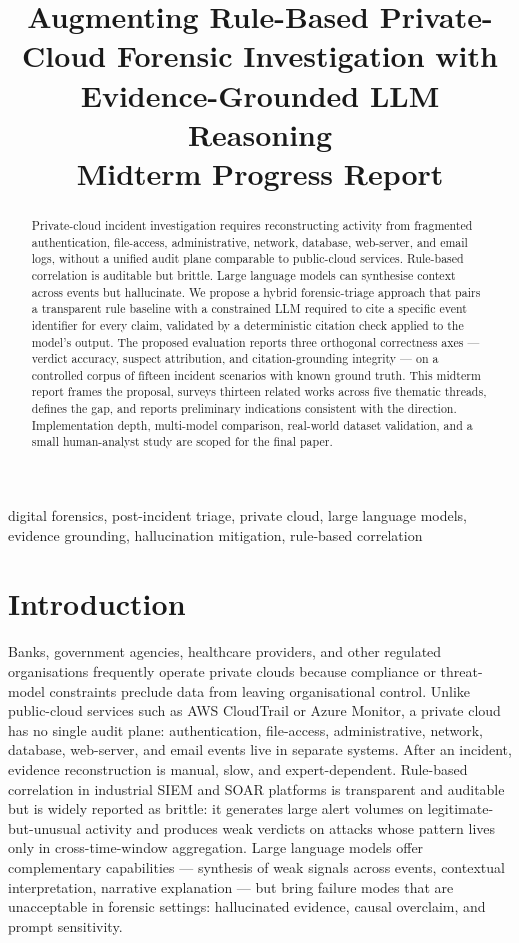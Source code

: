 \documentclass[conference]{IEEEtran}
\title{Augmenting Rule-Based Private-Cloud Forensic Investigation with Evidence-Grounded LLM Reasoning\\
\large Midterm Progress Report}
\author{%
  \IEEEauthorblockN{Md.~Nazmul Hasan}
}
\begin{document}
\maketitle

\begin{abstract}
Private-cloud incident investigation requires reconstructing activity from fragmented authentication, file-access, administrative, network, database, web-server, and email logs, without a unified audit plane comparable to public-cloud services. Rule-based correlation is auditable but brittle. Large language models can synthesise context across events but hallucinate. We propose a hybrid forensic-triage approach that pairs a transparent rule baseline with a constrained LLM required to cite a specific event identifier for every claim, validated by a deterministic citation check applied to the model's output. The proposed evaluation reports three orthogonal correctness axes --- verdict accuracy, suspect attribution, and citation-grounding integrity --- on a controlled corpus of fifteen incident scenarios with known ground truth. This midterm report frames the proposal, surveys thirteen related works across five thematic threads, defines the gap, and reports preliminary indications consistent with the direction. Implementation depth, multi-model comparison, real-world dataset validation, and a small human-analyst study are scoped for the final paper.
\end{abstract}

\begin{IEEEkeywords}
digital forensics, post-incident triage, private cloud, large language models, evidence grounding, hallucination mitigation, rule-based correlation
\end{IEEEkeywords}

\section{Introduction}
\label{sec:intro}

Banks, government agencies, healthcare providers, and other regulated organisations frequently operate private clouds because compliance or threat-model constraints preclude data from leaving organisational control. Unlike public-cloud services such as AWS CloudTrail or Azure Monitor, a private cloud has no single audit plane: authentication, file-access, administrative, network, database, web-server, and email events live in separate systems. After an incident, evidence reconstruction is manual, slow, and expert-dependent. Rule-based correlation in industrial SIEM and SOAR platforms is transparent and auditable but is widely reported as brittle: it generates large alert volumes on legitimate-but-unusual activity and produces weak verdicts on attacks whose pattern lives only in cross-time-window aggregation. Large language models offer complementary capabilities --- synthesis of weak signals across events, contextual interpretation, narrative explanation --- but bring failure modes that are unacceptable in forensic settings: hallucinated evidence, causal overclaim, and prompt sensitivity.
\end{document}
